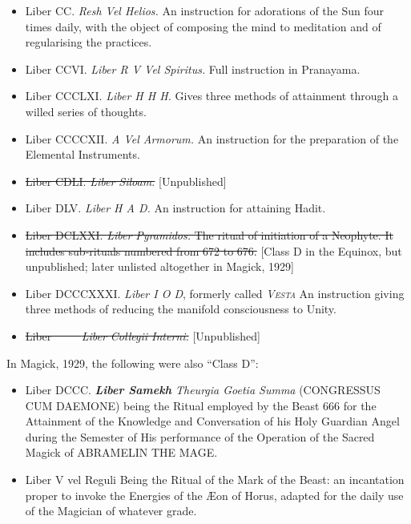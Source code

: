 \begin{itemize}
\item Liber CC. \textemdash{} \textit{Resh Vel Helios.} An instruction for adorations of the Sun four times daily, with the object of composing the mind to meditation and of regularising the practices.
\item Liber CCVI. \textemdash{} \textit{Liber R V Vel Spiritus.} Full instruction in Pranayama.
\item Liber CCCLXI. \textemdash{} \textit{Liber H H H.} Gives three methods of attainment through a willed series of thoughts.
\item Liber CCCCXII. \textemdash{} \textit{A Vel Armorum.} An instruction for the preparation of the Elemental Instruments.
\item \sout{Liber CDLI. \textemdash{} \textit{Liber Siloam.}} [Unpublished]
\item Liber DLV. \textemdash{} \textit{Liber H A D.} An instruction for attaining Hadit.
\item \sout{Liber DCLXXI. \textemdash{} \textit{Liber Pyramidos.} The ritual of initiation of a Neophyte. It includes sub-rituals numbered from 672 to 676.} [Class D in the Equinox, but unpublished; later unlisted altogether in Magick, 1929]
\item Liber DCCCXXXI. \textemdash{} \textit{Liber I O D}, formerly called \textit{\textsc{Vesta}} An instruction giving three methods of reducing the manifold consciousness to Unity.
\item \sout{Liber \-\ \-\ \-\ \-\ \textemdash{} \textit{Liber Collegii Interni.}} [Unpublished]
\end{itemize}

In Magick, 1929, the following were also \enquote{Class D}:
\begin{itemize}
\item Liber DCCC. \textemdash{} \textit{\textbf{Liber Samekh} Theurgia Goetia Summa} (CONGRESSUS CUM DAEMONE) being the Ritual employed by the Beast 666 for the Attainment of the Knowledge and Conversation of his Holy Guardian Angel during the Semester of His performance of the Operation of the Sacred Magick of ABRAMELIN THE MAGE.
\item Liber V vel Reguli \textemdash{} Being the Ritual of the Mark of the Beast: an incantation proper to invoke the Energies of the \AE{}on of Horus, adapted for the daily use of the Magician of whatever grade.
\end{itemize}


